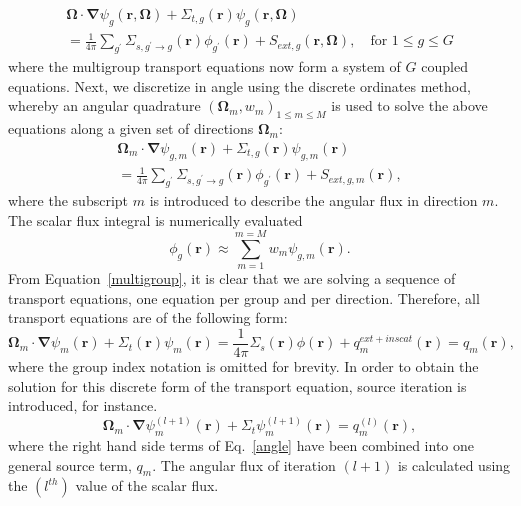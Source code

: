 \documentclass{anstrans}
\renewcommand{\vec}[1]{\bm{#1}} %
\newcommand{\vr}{\vec{r}}
\newcommand{\vo}{\vec{\Omega}}
\begin{document}
\begin{multline}
\vo \cdot \vec \nabla \psi_g(\vr,\vo) +\Sigma_{t,g}(\vr) \psi_g(\vr,\vo)\\ = \frac{1}{4\pi}\sum_{g^{\prime}}\Sigma_{s,g^{\prime}\to g}(\vr)\phi_{g^{\prime}}(\vr) + S_{ext,g}(\vr,\vo), \quad \text{for } 1 \le g \le G
\label{multigroup}
\end{multline}
where the multigroup transport equations now form a system of $G$ coupled equations. 
%
Next, we discretize in angle using the discrete ordinates method, whereby an angular quadrature $\left( \vo_m, w_m \right)_{1 \le m \le M}$ is used to solve the above equations along a given set of directions $\vo_m$:
\begin{multline}
\vo_m \cdot \vec \nabla \psi_{g,m}(\vr) +\Sigma_{t,g}(\vr) \psi_{g,m}(\vr)  \\= \frac{1}{4\pi}\sum_{g^{\prime}}\Sigma_{s,g^{\prime}\to g}(\vr)\phi_{g^{\prime}}(\vr) + S_{ext,g,m}(\vr),
\label{angle}
\end{multline}
where the subscript $m$ is introduced to describe the angular flux in direction $m$. 
The scalar flux integral is numerically evaluated
\begin{equation}
\label{def_scalar_flux_2}
\phi_g(\vr) \approx \sum_{m=1}^{m=M} w_m \psi_{g,m}(\vr).
\end{equation}
%
From Equation~\eqref{multigroup}, it is clear that we are solving a sequence of transport equations, one equation per group and per direction. Therefore, all transport equations are of the following form:
\begin{equation}
\vo_m \cdot \vec \nabla \psi_{m}(\vr) +\Sigma_{t}(\vr) \psi_{m}(\vr)  = \frac{1}{4\pi}\Sigma_{s}(\vr)\phi(\vr) + q^{ext+inscat}_m(\vr) = q_m(\vr),
\end{equation}
where the group index notation is omitted for brevity.
%
In order to obtain the solution for this discrete form of the transport equation, source iteration is introduced, for instance. %
\begin{equation}
\vo_m \cdot \vec\nabla \psi_m^{(l+1)}(\vr) + \Sigma_t \psi_m^{(l+1)}(\vr) = q_m^{(l)}(\vr),
\label{iteration}
\end{equation}
where the right hand side terms of Eq.~\eqref{angle} have been combined into one general source term, $q_m$. The angular flux of iteration $(l+1)$ is calculated using the $(l^{th})$ value of the scalar flux.
\end{document}
